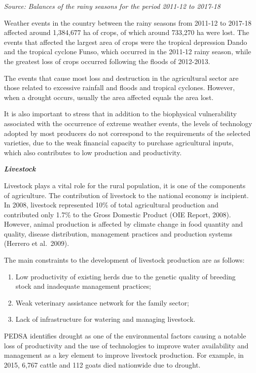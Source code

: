 \documentclass[
]{book}
\begin{document}
\emph{Source: Balances of the rainy seasons for the period 2011-12 to 2017-18}

Weather events in the country between the rainy seasons from 2011-12 to 2017-18 affected around 1,384,677 ha of crops, of which around 733,270 ha were lost. The events that affected the largest area of crops were the tropical depression Dando and the tropical cyclone Funso, which occurred in the 2011-12 rainy season, while the greatest loss of crops occurred following the floods of 2012-2013.

The events that cause most loss and destruction in the agricultural sector are those related to excessive rainfall and floods and tropical cyclones. However, when a drought occurs, usually the area affected equals the area lost.

It is also important to stress that in addition to the biophysical vulnerability associated with the occurrence of extreme weather events, the levels of technology adopted by most producers do not correspond to the requirements of the selected varieties, due to the weak financial capacity to purchase agricultural inputs, which also contributes to low production and productivity.

\textbf{\emph{Livestock}}

Livestock plays a vital role for the rural population, it is one of the components of agriculture. The contribution of livestock to the national economy is incipient. In 2008, livestock represented 10\% of total agricultural production and contributed only 1.7\% to the Gross Domestic Product (OIE Report, 2008). However, animal production is affected by climate change in food quantity and quality, disease distribution, management practices and production systems (Herrero et al.~2009).

The main constraints to the development of livestock production are as follows:

\begin{enumerate}
\def\labelenumi{(\roman{enumi})}
\item
  Low productivity of existing herds due to the genetic quality of breeding stock and inadequate management practices;
\item
  Weak veterinary assistance network for the family sector;
\item
  Lack of infrastructure for watering and managing livestock.
\end{enumerate}

PEDSA identifies drought as one of the environmental factors causing a notable loss of productivity and the use of technologies to improve water availability and management as a key element to improve livestock production. For example, in 2015, 6,767 cattle and 112 goats died nationwide due to drought.
\end{document}
